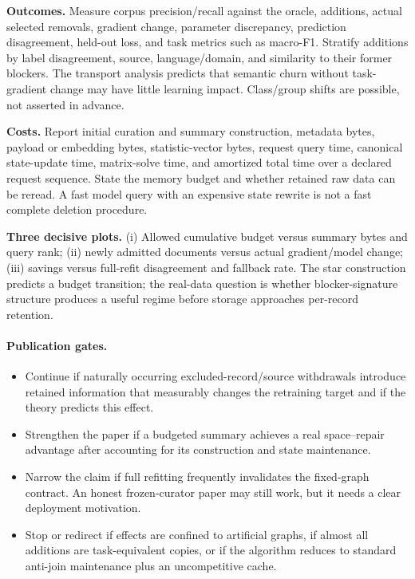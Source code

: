\documentclass[11pt,a4paper]{article}
\theoremstyle{definition}\newtheorem{definition}[theorem]{Definition}
\begin{document}
\textbf{Outcomes.} Measure corpus precision/recall against the oracle, additions, actual selected removals, gradient change, parameter discrepancy, prediction disagreement, held-out loss, and task metrics such as macro-F1. Stratify additions by label disagreement, source, language/domain, and similarity to their former blockers. The transport analysis predicts that semantic churn without task-gradient change may have little learning impact. Class/group shifts are possible, not asserted in advance.

\textbf{Costs.} Report initial curation and summary construction, metadata bytes, payload or embedding bytes, statistic-vector bytes, request query time, canonical state-update time, matrix-solve time, and amortized total time over a declared request sequence. State the memory budget and whether retained raw data can be reread. A fast model query with an expensive state rewrite is not a fast complete deletion procedure.

\textbf{Three decisive plots.} (i) Allowed cumulative budget versus summary bytes and query rank; (ii) newly admitted documents versus actual gradient/model change; (iii) savings versus full-refit disagreement and fallback rate. The star construction predicts a budget transition; the real-data question is whether blocker-signature structure produces a useful regime before storage approaches per-record retention.

\paragraph{Publication gates.}
\begin{itemize}
\item Continue if naturally occurring excluded-record/source withdrawals introduce retained information that measurably changes the retraining target and if the theory predicts this effect.
\item Strengthen the paper if a budgeted summary achieves a real space--repair advantage after accounting for its construction and state maintenance.
\item Narrow the claim if full refitting frequently invalidates the fixed-graph contract. An honest frozen-curator paper may still work, but it needs a clear deployment motivation.
\item Stop or redirect if effects are confined to artificial graphs, if almost all additions are task-equivalent copies, or if the algorithm reduces to standard anti-join maintenance plus an uncompetitive cache.
\end{itemize}
\end{document}
